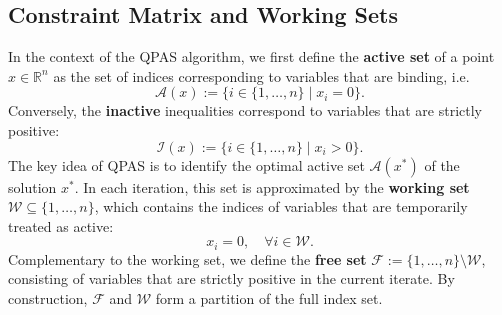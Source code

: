 \documentclass{book}
\theoremstyle{definition}
\newcounter{algorithm_}
\numberwithin{algorithm_}{chapter}
\begin{document}
\subsection{Constraint Matrix and Working Sets}

In the context of the QPAS algorithm, we first define the \textbf{active set} of a point $x \in \mathbb{R}^n$ as the set of indices corresponding to variables that are binding, i.e.
\begin{equation}
\mathcal{A}(x) := \{ i \in \{1, \dots, n\} \mid x_i = 0 \}.
\end{equation}
Conversely, the \textbf{inactive} inequalities correspond to variables that are strictly positive:
\begin{equation}
\mathcal{I}(x) := \{ i \in \{1, \dots, n\} \mid x_i > 0 \}.
\end{equation}
The key idea of QPAS is to identify the optimal active set $\mathcal{A}(x^*)$ of the solution $x^*$. In each iteration, this set is approximated by the \textbf{working set} $\mathcal{W} \subseteq \{1, \dots, n\}$, which contains the indices of variables that are temporarily treated as active:
\[
x_i = 0, \quad \forall i \in \mathcal{W}.
\]
Complementary to the working set, we define the \textbf{free set} $\mathcal{F} := \{1, \dots, n\} \setminus \mathcal{W}$, consisting of variables that are strictly positive in the current iterate. By construction, $\mathcal{F}$ and $\mathcal{W}$ form a partition of the full index set.

\bigskip
\end{document}
